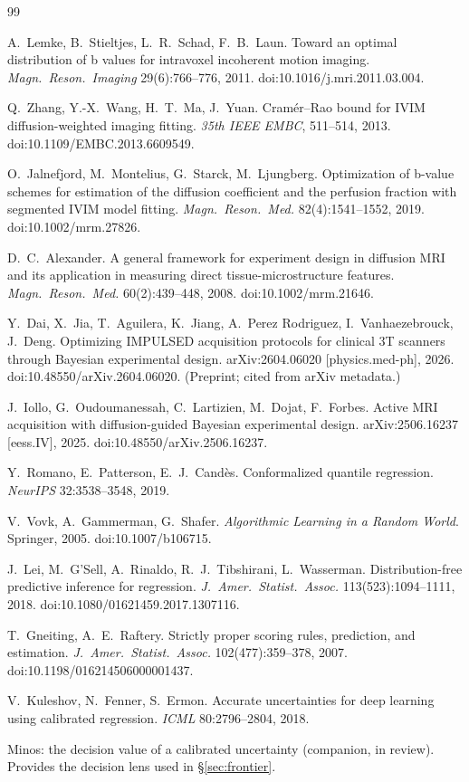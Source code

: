 \documentclass[11pt]{article}
\begin{document}
\begin{thebibliography}{99}
\small

 A.~Lemke, B.~Stieltjes, L.~R.~Schad, F.~B.~Laun.
Toward an optimal distribution of b values for intravoxel incoherent motion imaging.
\emph{Magn.\ Reson.\ Imaging} 29(6):766--776, 2011. doi:10.1016/j.mri.2011.03.004.

 Q.~Zhang, Y.-X.~Wang, H.~T.~Ma, J.~Yuan.
Cram\'er--Rao bound for IVIM diffusion-weighted imaging fitting.
\emph{35th IEEE EMBC}, 511--514, 2013. doi:10.1109/EMBC.2013.6609549.

 O.~Jalnefjord, M.~Montelius, G.~Starck, M.~Ljungberg.
Optimization of b-value schemes for estimation of the diffusion coefficient and the
perfusion fraction with segmented IVIM model fitting.
\emph{Magn.\ Reson.\ Med.} 82(4):1541--1552, 2019. doi:10.1002/mrm.27826.

 D.~C.~Alexander.
A general framework for experiment design in diffusion MRI and its application in
measuring direct tissue-microstructure features.
\emph{Magn.\ Reson.\ Med.} 60(2):439--448, 2008. doi:10.1002/mrm.21646.

 Y.~Dai, X.~Jia, T.~Aguilera, K.~Jiang, A.~Perez Rodriguez,
I.~Vanhaezebrouck, J.~Deng. Optimizing IMPULSED acquisition protocols for clinical 3T
scanners through Bayesian experimental design. arXiv:2604.06020 [physics.med-ph], 2026.
doi:10.48550/arXiv.2604.06020. (Preprint; cited from arXiv metadata.)

 J.~Iollo, G.~Oudoumanessah, C.~Lartizien, M.~Dojat, F.~Forbes.
Active MRI acquisition with diffusion-guided Bayesian experimental design.
arXiv:2506.16237 [eess.IV], 2025. doi:10.48550/arXiv.2506.16237.

 Y.~Romano, E.~Patterson, E.~J.~Cand\`es.
Conformalized quantile regression. \emph{NeurIPS} 32:3538--3548, 2019.

 V.~Vovk, A.~Gammerman, G.~Shafer.
\emph{Algorithmic Learning in a Random World}. Springer, 2005. doi:10.1007/b106715.

 J.~Lei, M.~G'Sell, A.~Rinaldo, R.~J.~Tibshirani, L.~Wasserman.
Distribution-free predictive inference for regression.
\emph{J.\ Amer.\ Statist.\ Assoc.} 113(523):1094--1111, 2018. doi:10.1080/01621459.2017.1307116.

 T.~Gneiting, A.~E.~Raftery.
Strictly proper scoring rules, prediction, and estimation.
\emph{J.\ Amer.\ Statist.\ Assoc.} 102(477):359--378, 2007. doi:10.1198/016214506000001437.

 V.~Kuleshov, N.~Fenner, S.~Ermon.
Accurate uncertainties for deep learning using calibrated regression.
\emph{ICML} 80:2796--2804, 2018.

 Minos: the decision value of a calibrated uncertainty (companion,
in review). Provides the decision lens used in \S\ref{sec:frontier}.

\end{thebibliography}
\end{document}
